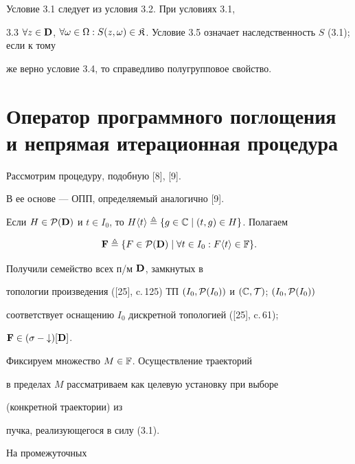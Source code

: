 Условие 3.1 следует из условия 3.2. При условиях 3.1,


3.3 $\fo{z} \in {\bold D}$, $\fo{\omega} \in \Om:S(z,\omega) \in


{\frak K}$. Условие 3.5 означает наследственность $S$ (3.1); если к тому


же верно условие 3.4, то справедливо полугрупповое свойство.





\section{Оператор программного поглощения\protect\\


и непрямая итерационная процедура}





Рассмотрим процедуру, подобную [8], [9].


В ее основе --- ОПП, определяемый аналогично [9].


Если $H \in {{\cal P}({\bold D})}$ и $t \in {I_0}$, то ${H\langle{t}\rangle}


\stac \{g \in {\Bbb C} \mid (t,g) \in H\}$. Полагаем


\begin{equation}


{\bold F} \stac \{F \in {{\cal P}({\bold D})} \mid \fo{t} \in {I_0}:


F\langle{t}\rangle \in {\Bbb F}\}.


\end{equation}


Получили семейство всех п/м ${\bold D}$, замкнутых в


топологии произведения ([25], c.\,125) ТП $({I_0},


{{\cal P}(I_0)})$ и $({\Bbb C},{\cal T})$; $({I_0},{{\cal P}(I_0)})$


соответствует оснащению $I_0$ дискретной топологией ([25], c.\,61);


${\bold F} \in (\sigma - {\downarrow})[{\bold D}]$.


Фиксируем множество $M \in {\Bbb F}$. Осуществление траекторий


в пределах $M$ рассматриваем как целевую установку при выборе


(конкретной траектории) из


пучка, реализующегося в силу (3.1).


На промежуточных


